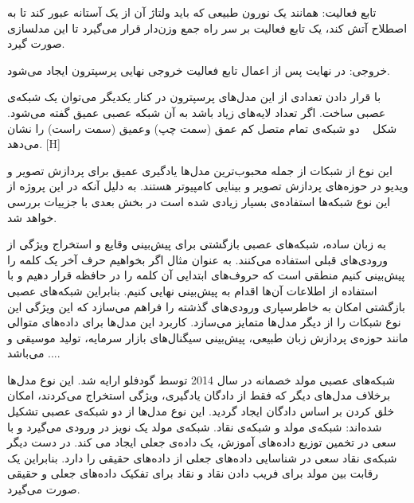  تابع فعالیت: همانند یک نورون طبیعی که باید ولتاژ آن از یک آستانه عبور کند تا به اصطلاح آتش کند، یک تابع فعالیت بر سر راه جمع وزن‌دار قرار می‌گیرد تا این مدلسازی صورت گیرد.

 خروجی: در نهایت پس از اعمال تابع فعالیت خروجی نهایی پرسپترون ایجاد می‌شود.

با قرار دادن تعدادی از این مدل‌های پرسپترون در کنار یکدیگر می‌توان یک شبکه‌ی عصبی ساخت. اگر تعداد لایه‌های زیاد باشد به آن شبکه عصبی عمیق گفته می‌شود. شکل ~ دو شبکه‌ی تمام متصل کم عمق (سمت چپ) وعمیق (سمت راست) را نشان می‌دهد. 
[H]

این نوع از شبکات از جمله محبوب‌ترین مدل‌ها یادگیری عمیق برای پردازش تصویر و ویدیو در حوزه‌های پردازش تصویر و بینایی کامپیوتر هستند. به دلیل آنکه در این پروژه از این نوع شبکه‌ها استفاده‌ی بسیار زیادی شده است در بخش بعدی با جزییات بررسی خواهد شد.

به زبان ساده، شبکه‌های عصبی بازگشتی برای پیش‌بینی وقایع و استخراج ویژگی از ورودی‌های قبلی استفاده می‌کنند. به عنوان مثال اگر بخواهیم حرف آخر یک کلمه را پیش‌بینی کنیم منطقی است که حروف‌های ابتدایی آن کلمه را در حافظه قرار دهیم و با استفاده از اطلاعات آن‌ها اقدام به پیش‌بینی نهایی کنیم. بنابراین شبکه‌های عصبی بازگشتی امکان به ‌خاطرسپاری ورودی‌های گذشته را فراهم می‌سازد که این ویژگی این نوع شبکات را از دیگر مدل‌ها متمایز می‌سازد. کاربرد این مدل‌ها برای داده‌های متوالی مانند حوزه‌ی پردازش زبان طبیعی، پیش‌بینی سیگنال‌های بازار سرمایه، تولید موسیقی و ... می‌باشد.

شبکه‌های عصبی مولد خصمانه در سال 2014 توسط گودفلو  ارایه شد. این نوع مدل‌ها برخلاف مدل‌های دیگر که فقط از دادگان یادگیری، ویژگی استخراج می‌کردند، امکان خلق کردن بر اساس دادگان ایجاد گردید. این نوع مدل‌ها از دو شبکه‌ی عصبی تشکیل شده‌اند: شبکه‌ی مولد و شبکه‌ی نقاد. شبکه‌ی مولد یک نویز در ورودی می‌گیرد و با سعی در تخمین توزیع داده‌های آموزش، یک داده‌ی جعلی ایجاد می کند. در دست دیگر شبکه‌ی نقاد سعی در شناسایی داده‌های جعلی از داده‌های حقیقی را دارد. بنابراین یک رقابت بین مولد برای فریب دادن نقاد و نقاد برای تفکیک داده‌های جعلی و حقیقی صورت می‌گیرد. 

